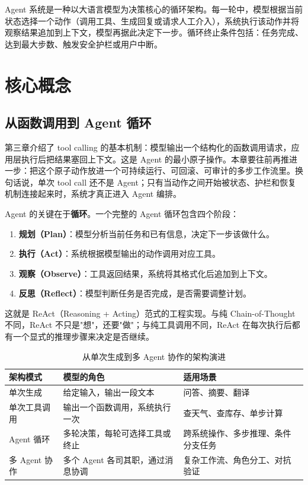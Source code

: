 \begin{definition}[Agent 系统]
Agent 系统是一种以大语言模型为决策核心的循环架构。每一轮中，模型根据当前状态选择一个动作（调用工具、生成回复或请求人工介入），系统执行该动作并将观察结果追加到上下文，模型再据此决定下一步。循环终止条件包括：任务完成、达到最大步数、触发安全护栏或用户中断。
\end{definition}

\section{核心概念}

\subsection{从函数调用到 Agent 循环}
第三章介绍了 tool calling 的基本机制：模型输出一个结构化的函数调用请求，应用层执行后把结果塞回上下文。这是 Agent 的最小原子操作。本章要往前再推进一步：把这个原子动作放进一个可持续运行、可回滚、可审计的多步工作流里。换句话说，单次 tool call 还不是 Agent；只有当动作之间开始被状态、护栏和恢复机制连接起来时，系统才真正进入 Agent 编排。

Agent 的关键在于\textbf{循环}。一个完整的 Agent 循环包含四个阶段：

\begin{enumerate}
  \item \textbf{规划（Plan）}：模型分析当前任务和已有信息，决定下一步该做什么。
  \item \textbf{执行（Act）}：系统根据模型输出的动作调用对应工具。
  \item \textbf{观察（Observe）}：工具返回结果，系统将其格式化后追加到上下文。
  \item \textbf{反思（Reflect）}：模型判断任务是否完成，是否需要调整计划。
\end{enumerate}

这就是 ReAct（Reasoning + Acting）范式的工程实现。与纯 Chain-of-Thought 不同，ReAct 不只是"想"，还要"做"；与纯工具调用不同，ReAct 在每次执行后都有一个显式的推理步骤来决定是否继续。

\begin{table}[H]
\centering
\small
\begin{tabularx}{\textwidth}{>{\raggedright\arraybackslash}p{2.5cm}>{\raggedright\arraybackslash}p{3.5cm}>{\raggedright\arraybackslash}X}
\toprule
\textbf{架构模式} & \textbf{模型的角色} & \textbf{适用场景} \\
\midrule
单次生成 & 给定输入，输出一段文本 & 问答、摘要、翻译 \\
单次工具调用 & 输出一个函数调用，系统执行一次 & 查天气、查库存、单步计算 \\
Agent 循环 & 多轮决策，每轮可选择工具或终止 & 跨系统操作、多步推理、条件分支任务 \\
多 Agent 协作 & 多个 Agent 各司其职，通过消息协调 & 复杂工作流、角色分工、对抗验证 \\
\bottomrule
\end{tabularx}
\caption{从单次生成到多 Agent 协作的架构演进}
\label{tab:agent-architecture-spectrum}
\end{table}


